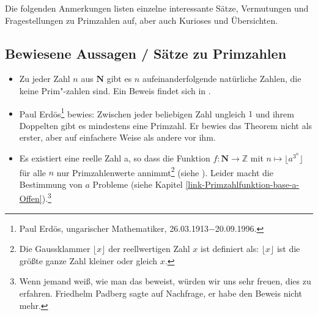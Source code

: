 \begin{refsegment}
Die folgenden Anmerkungen listen einzelne interessante Sätze, Vermutungen und
Fragestellungen zu Primzahlen auf, aber auch Kurioses und Übersichten.


\subsection{Bewiesene Aussagen / Sätze zu Primzahlen}
\begin{itemize}

  \item Zu jeder Zahl $n$ aus $\textbf{N}$ gibt es $n$ aufeinanderfolgende
     natürliche Zahlen, die keine Prim"-zahlen sind.
     Ein Beweis findet sich in \cite[S. 79]{Padberg1996}.


  \item Paul Erdös\footnote{%
        Paul Erdös, ungarischer Mathematiker,
        26.03.1913$-$20.09.1996. }
     bewies:
     Zwischen jeder beliebigen Zahl ungleich $1$ und ihrem Doppelten gibt
     es mindestens eine Primzahl. Er bewies das Theorem nicht als erster,
     aber auf einfachere Weise als andere vor ihm.


  \item %
        \label{link-Primzahlfunktion-base-a-Proof}
     Es existiert eine reelle Zahl a, so dass die Funktion
     $f: \textbf{N} \rightarrow {\mathbb Z}$ mit $n \mapsto \lfloor a^{3^n}\rfloor$
     für alle $n$ nur Primzahlenwerte annimmt\footnote{%
     Die Gaussklammer  $\lfloor x \rfloor $ der
     reellwertigen Zahl $x$ ist definiert als: $\lfloor x \rfloor $ ist die
     größte ganze Zahl kleiner oder gleich $x$.
     } (siehe \cite[S. 82]{Padberg1996}).
     Leider macht die Bestimmung von $a$ Probleme (siehe Kapitel
     \ref{link-Primzahlfunktion-base-a-Offen}).\footnote{%
     Wenn jemand weiß, wie man das beweist, würden wir uns sehr freuen, dies
     zu erfahren. Friedhelm Padberg sagte auf Nachfrage, er habe den
     Beweis nicht mehr.}




\end{itemize}
\end{refsegment}
